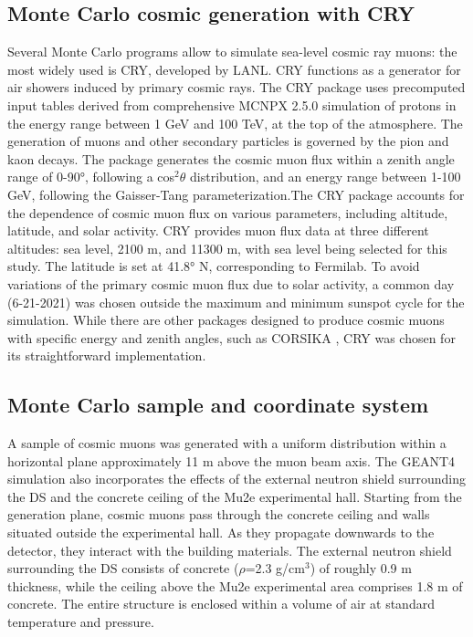 \subsection{Monte Carlo cosmic generation with CRY}
Several Monte Carlo programs allow to simulate sea-level 
cosmic ray muons: the most widely used is CRY, developed 
by LANL. CRY \cite{Hagmann2007CosmicraySG} functions as a generator for air showers 
induced by primary cosmic rays. The CRY package uses 
precomputed input tables derived from comprehensive 
MCNPX 2.5.0 simulation of protons in the energy range 
between 1 GeV and 100 TeV, at the top of the atmosphere.
The generation of muons and other secondary particles 
is governed by the pion and kaon decays. The package 
generates the cosmic muon flux within a zenith angle range 
of 0-90°, following a cos$^2 \theta$ distribution, and an 
energy range between 1-100 GeV, following the Gaisser-Tang
parameterization.The CRY package accounts for the 
dependence of cosmic muon flux on various parameters, 
including altitude, latitude, and solar activity. CRY 
provides muon flux data at three different altitudes: 
sea level, 2100 m, and 11300 m, with sea level being 
selected for this study. The latitude is set at 41.8° N, 
corresponding to Fermilab. To avoid variations of the 
primary cosmic muon flux due to solar activity, a 
common day (6-21-2021) was chosen outside the maximum and minimum 
sunspot cycle for the simulation. While there are other 
packages designed to produce cosmic muons with specific 
energy and zenith angles, such as CORSIKA \cite{Heck:1998vt}, CRY was chosen 
for its straightforward implementation.


\subsection{Monte Carlo sample and coordinate system }\label{genplane}
A sample of cosmic muons was generated with a uniform distribution within a
horizontal plane approximately 11 m above the muon beam axis. The GEANT4 
simulation also incorporates the effects of the external neutron shield surrounding the DS 
and the concrete ceiling of the Mu2e experimental hall. Starting from the generation plane, 
cosmic muons pass through the concrete ceiling and walls situated outside the experimental hall. 
As they propagate downwards to the detector, they interact with the building materials. 
The external neutron shield surrounding the DS consists of concrete ($\rho$=2.3 g/cm$^3$) of  
roughly 0.9 m thickness, while the ceiling above the Mu2e experimental area comprises 1.8 m of concrete. 
The entire structure is enclosed within a volume of air at standard temperature and pressure.

